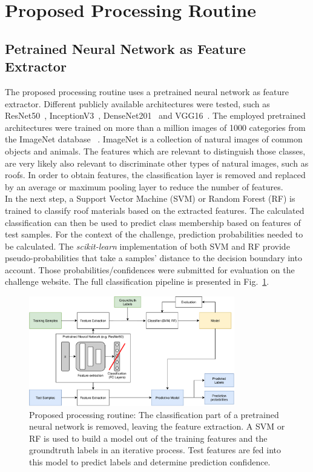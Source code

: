 \documentclass[11pt]{article}
\begin{document}
	
	\section{Proposed Processing Routine}
	
	\subsection{Petrained Neural Network as Feature Extractor}		
	
	The proposed processing routine uses a pretrained neural network as feature extractor. Different publicly available architectures were tested, such as ResNet50~\cite{resnet}, InceptionV3~\cite{inceptionv3}, DenseNet201~\cite{densenet} and VGG16~\cite{vgg}. The employed pretrained architectures were trained on more than a million images of 1000 categories from the ImageNet database ~\cite{imagenet}. 
	ImageNet is a collection of natural images of common objects and animals. The features which are relevant to distinguish those classes, are very likely also relevant to discriminate other types of natural images, such as roofs.
	In order to obtain features, the classification layer is removed and replaced by an average or maximum pooling layer to reduce the number of features.\\	
	
	In the next step, a Support Vector Machine (SVM) or Random Forest (RF) is trained to classify roof materials based on the extracted features. The calculated classification can then be used to predict class membership based on features of test samples. For the context of the challenge, prediction probabilities needed to be calculated. The \textit{scikit-learn} implementation of both SVM and RF provide pseudo-probabilities that take a samples' distance to the decision boundary into account. Those probabilities/confidences were submitted for evaluation on the challenge website.
	The full classification pipeline is presented in Fig.~\ref{fig:flowchart}.
	
	
	\begin{figure}
		\centering		
		\includegraphics[width=0.8\textwidth]{figures/flowchart.pdf}
		\caption{Proposed processing routine: The classification part of a pretrained neural network is removed, leaving the feature extraction. A SVM or RF is used to build a model out of the training features and the groundtruth labels in an iterative process. Test features are fed into this model to predict labels and determine prediction confidence.}
		\label{fig:flowchart}
	\end{figure}
\end{document}
